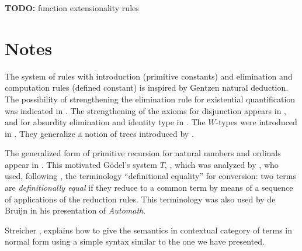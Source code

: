 \textbf{TODO:} function extensionality rules

\egroup

\section{Notes}\label{subsec:general-remarks}


  The system of rules with introduction (primitive constants) and elimination
  and computation rules (defined constant) is inspired by Gentzen natural
  deduction. The possibility of strengthening the elimination rule for
  existential quantification was indicated in \cite{Howard-1969}. The
  strengthening of the axioms for disjunction appears in \cite{Martin-Lof-1972},
  and for absurdity elimination and identity type in \cite{Martin-Lof-1973}. The
  $W$-types were introduced in \cite{Martin-Lof-1979}. They generalize a notion
  of trees introduced by \cite{Tait-1968}.

  The generalized form of primitive recursion for natural numbers and ordinals
  appear in \cite{Hilbert-1925}.  This motivated G\"odel's system $T$,
  \cite{Goedel-T-1958}, which was analyzed by \cite{Tait-1966}, who used,
  following \cite{Goedel-1958}, the terminology ``definitional equality'' for
  conversion: two terms are {\em definitionally equal} if they reduce to a
  common term by means of a sequence of applications of the reduction
  rules. This terminology was also used by de Bruijn \cite{deBruijn-1973} in his
  presentation of {\em Automath}.

  Streicher \cite[Theorem 4.13]{Streicher-1991}, explains how to give the
  semantics in contextual category of terms in normal form using a simple syntax
  similar to the one we have presented.


